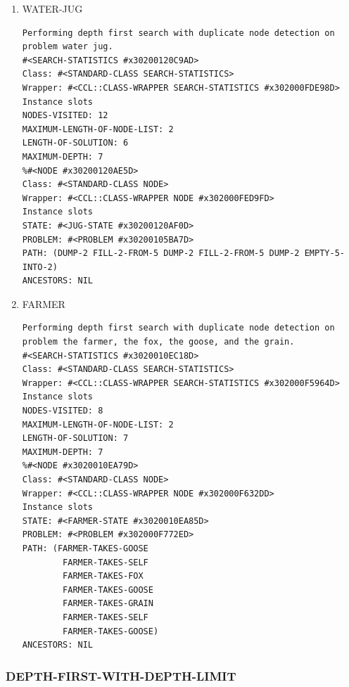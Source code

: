 \documentclass[a4paper,8pt]{article}
\begin{document}
\begin{enumerate}
\item WATER-JUG
\label{sec-1-2-2-1}
\begin{verbatim}
Performing depth first search with duplicate node detection on problem water jug.
#<SEARCH-STATISTICS #x30200120C9AD>
Class: #<STANDARD-CLASS SEARCH-STATISTICS>
Wrapper: #<CCL::CLASS-WRAPPER SEARCH-STATISTICS #x302000FDE98D>
Instance slots
NODES-VISITED: 12
MAXIMUM-LENGTH-OF-NODE-LIST: 2
LENGTH-OF-SOLUTION: 6
MAXIMUM-DEPTH: 7
%#<NODE #x30200120AE5D>
Class: #<STANDARD-CLASS NODE>
Wrapper: #<CCL::CLASS-WRAPPER NODE #x302000FED9FD>
Instance slots
STATE: #<JUG-STATE #x30200120AF0D>
PROBLEM: #<PROBLEM #x30200105BA7D>
PATH: (DUMP-2 FILL-2-FROM-5 DUMP-2 FILL-2-FROM-5 DUMP-2 EMPTY-5-INTO-2)
ANCESTORS: NIL
\end{verbatim}
\item FARMER
\label{sec-1-2-2-2}
\begin{verbatim}
Performing depth first search with duplicate node detection on problem the farmer, the fox, the goose, and the grain.
#<SEARCH-STATISTICS #x3020010EC18D>
Class: #<STANDARD-CLASS SEARCH-STATISTICS>
Wrapper: #<CCL::CLASS-WRAPPER SEARCH-STATISTICS #x302000F5964D>
Instance slots
NODES-VISITED: 8
MAXIMUM-LENGTH-OF-NODE-LIST: 2
LENGTH-OF-SOLUTION: 7
MAXIMUM-DEPTH: 7
%#<NODE #x3020010EA79D>
Class: #<STANDARD-CLASS NODE>
Wrapper: #<CCL::CLASS-WRAPPER NODE #x302000F632DD>
Instance slots
STATE: #<FARMER-STATE #x3020010EA85D>
PROBLEM: #<PROBLEM #x302000F772ED>
PATH: (FARMER-TAKES-GOOSE
        FARMER-TAKES-SELF
        FARMER-TAKES-FOX
        FARMER-TAKES-GOOSE
        FARMER-TAKES-GRAIN
        FARMER-TAKES-SELF
        FARMER-TAKES-GOOSE)
ANCESTORS: NIL
\end{verbatim}
\end{enumerate}
\subsubsection{DEPTH-FIRST-WITH-DEPTH-LIMIT}
\label{sec-1-2-3}
\end{document}
